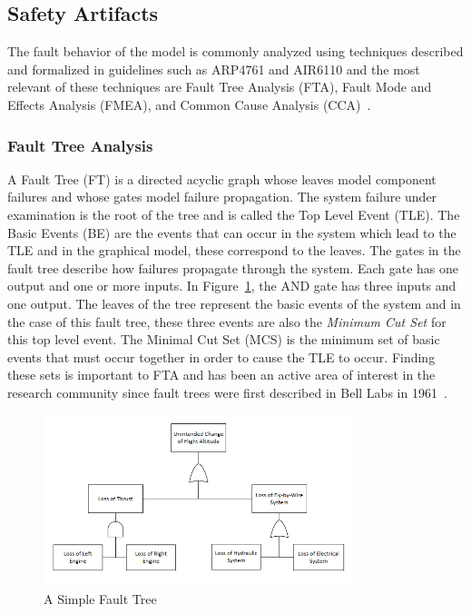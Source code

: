 \subsection{Safety Artifacts}
\label{subsec:safety_artifacts}

The fault behavior of the model is commonly analyzed using techniques described and formalized in guidelines such as ARP4761 and AIR6110 and the most relevant of these techniques are Fault Tree Analysis (FTA), Fault Mode and Effects Analysis (FMEA), and Common Cause Analysis (CCA)~\cite{SAE:ARP4761, AIR6110, 0f356f05e72f43018211b36f97c8854a, Bozzano:2010:DSA:1951720}. 

\subsubsection{Fault Tree Analysis}
A Fault Tree (FT) is a directed acyclic graph whose leaves model component failures and whose gates model failure propagation. The system failure under examination is the root of the tree and is called the Top Level Event (TLE). The Basic Events (BE) are the events that can occur in the system which lead to the TLE and in the graphical model, these correspond to the leaves. The gates in the fault tree describe how failures propagate through the system. Each gate has one output and one or more inputs. In Figure~\ref{fig:introFT}, the AND gate has three inputs and one output. The leaves of the tree represent the basic events of the system and in the case of this fault tree, these three events are also the \textit{Minimum Cut Set} for this top level event. The Minimal Cut Set (MCS) is the minimum set of basic events that must occur together in order to cause the TLE to occur. Finding these sets is important to FTA and has been an active area of interest in the research community since fault trees were first described in Bell Labs in 1961~\cite{historyFTA, 0f356f05e72f43018211b36f97c8854a}. 

\begin{figure}[h]
\begin{center}
\includegraphics[width=9cm]{images/ft.png}
\caption{A Simple Fault Tree} \label{fig:introFT}
\end{center}
\end{figure}

